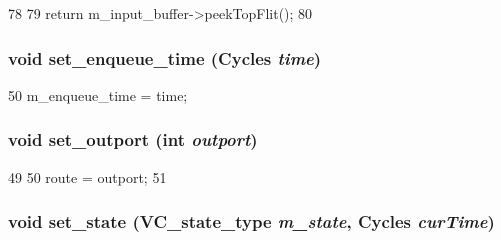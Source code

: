 \begin{DoxyCode}
78     {
79         return m_input_buffer->peekTopFlit();
80     }
\end{DoxyCode}
\hypertarget{classVirtualChannel__d_a0085608a6cbefba0baab19a2fcb0e27b}{
\subsubsection[{set\_\-enqueue\_\-time}]{\setlength{\rightskip}{0pt plus 5cm}void set\_\-enqueue\_\-time ({\bf Cycles} {\em time})}}
\label{classVirtualChannel__d_a0085608a6cbefba0baab19a2fcb0e27b}



\begin{DoxyCode}
50 { m_enqueue_time = time; }
\end{DoxyCode}
\hypertarget{classVirtualChannel__d_a2442dba51e5ab72ff066826cf9ab09cf}{
\subsubsection[{set\_\-outport}]{\setlength{\rightskip}{0pt plus 5cm}void set\_\-outport (int {\em outport})}}
\label{classVirtualChannel__d_a2442dba51e5ab72ff066826cf9ab09cf}



\begin{DoxyCode}
49 {
50     route = outport;
51 }
\end{DoxyCode}
\hypertarget{classVirtualChannel__d_a5447f3c4494e31e226d203d3e4e822df}{
\subsubsection[{set\_\-state}]{\setlength{\rightskip}{0pt plus 5cm}void set\_\-state ({\bf VC\_\-state\_\-type} {\em m\_\-state}, \/  {\bf Cycles} {\em curTime})}}
\label{classVirtualChannel__d_a5447f3c4494e31e226d203d3e4e822df}



